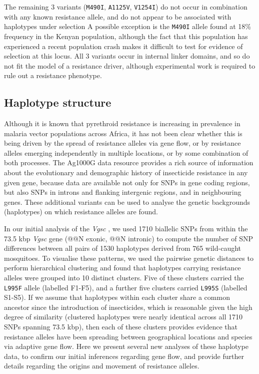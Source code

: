 \documentclass[a4paper,11pt,abstracton,hidelinks]{scrartcl}
\begin{document}
%
The remaining 3 variants (\texttt{M490I}, \texttt{A1125V}, \texttt{V1254I}) do not occur in combination with any known resistance allele, and do not appear to be associated with haplotypes under selection \cite{Ag1000gConsortium2017}
%
A possible exception is the \texttt{M490I} allele found at 18\% frequency in the Kenyan population, although the fact that this population has experienced a recent population crash makes it difficult to test for evidence of selection at this locus.
%
All 3 variants occur in internal linker domains, and so do not fit the model of a resistance driver, although experimental work is required to rule out a resistance phenotype.
%


\subsection*{Haplotype structure}


Although it is known that pyrethroid resistance is increasing in prevalence in malaria vector populations across Africa, it has not been clear whether this is being driven by the spread of resistance alleles via gene flow, or by resistance alleles emerging independently in multiple locations, or by some combination of both processes.
%
The Ag1000G data resource provides a rich source of information about the evolutionary and demographic history of insecticide resistance in any given gene, because data are available not only for SNPs in gene coding regions, but also SNPs in introns and flanking intergenic regions, and in neighbouring genes.
%
These additional variants can be used to analyse the genetic backgrounds (haplotypes) on which resistance alleles are found.

%
In our initial analysis of the \textit{Vgsc} \cite{Ag1000gConsortium2017}, we used 1710 biallelic SNPs from within the 73.5 kbp \textit{Vgsc} gene (@@N exonic, @@N intronic) to compute the number of SNP differences between all pairs of 1530 haplotypes derived from 765 wild-caught mosquitoes.
%
To visualise these patterns, we used the pairwise genetic distances to perform hierarchical clustering and found that haplotypes carrying resistance alleles were grouped into 10 distinct clusters.
%
Five of these clusters carried the \texttt{L995F} allele (labelled F1-F5), and a further five clusters carried \texttt{L995S} (labelled S1-S5).
%
If we assume that haplotypes within each cluster share a common ancestor since the introduction of insecticides, which is reasonable given the high degree of similarity (clustered haplotypes were nearly identical across all 1710 SNPs spanning 73.5 kbp), then each of these clusters provides evidence that resistance alleles have been spreading between geographical locations and species via adaptive gene flow.
%
Here we present several new analyses of these haplotype data, to confirm our initial inferences regarding gene flow, and provide further details regarding the origins and movement of resistance alleles.
%
\end{document}
